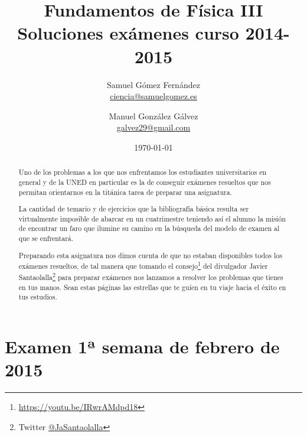 \documentclass[12pt, a4paper]{article}
\title{Fundamentos de Física III \\ Soluciones exámenes curso 2014-2015}
\date{\today}
\author{
    Samuel Gómez Fernández \\ \href{mailto:ciencia@samuelgomez.es}{ciencia@samuelgomez.es}
    \and
    Manuel González Gálvez \\ \href{mailto:galvez29@gmail.com}{galvez29@gmail.com}
    }
\begin{document}
    \begin{titlepage}
    \maketitle
    \thispagestyle{empty}
    \hypersetup{pageanchor=true}
    \renewcommand*\contentsname{Contenidos}

    \tableofcontents

    \vspace{1cm}
    \begin{abstract}
        Uno de los problemas a los que nos enfrentamos los estudiantes universitarios
        en general y de la UNED en particular es la de conseguir exámenes resueltos
        que nos permitan orientarnos en la titánica tarea de preparar una asignatura.

        La cantidad de temario y de ejercicios que la bibliografía básica resulta ser
        virtualmente imposible de abarcar en un cuatrimestre teniendo así el alumno
        la misión de encontrar un faro que ilumine su camino en la búsqueda del modelo
        de examen al que se enfrentará.

        Preparando esta asignatura nos dimos cuenta de que no estaban disponibles todos los
        exámenes resueltos, de tal manera que tomando el
        consejo\footnote{\href{https://youtu.be/IRwrAMdpd18}{https://youtu.be/IRwrAMdpd18}} del divulgador
        Javier Santaolalla\footnote{Twitter \href{https://twitter.com/jasantaolalla}{@JaSantaolalla}}
        para preparar exámenes nos lanzamos a resolver los problemas que tienes
        en tus manos. Sean estas páginas las estrellas que te guíen en tu viaje
        hacia el éxito en tus estudios.
    \end{abstract}
    \end{titlepage}



    \restoregeometry

    \section{Examen 1ª semana de febrero de 2015}
\end{document}
